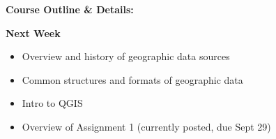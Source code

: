 \documentclass[aspectratio=169]{beamer}
\begin{document}
%		
%	
%	
%	
%	


%
%
%



\begin{frame}
	\LARGE{\textbf{Course Outline \& Details:}}
\end{frame}









\begin{frame}
	\textbf{Next Week}
	
	\begin{itemize}
		\item Overview and history of geographic data sources
		\item Common structures and formats of geographic data
		\item Intro to QGIS 
		\item Overview of Assignment 1 (currently posted, due Sept 29)
	\end{itemize}

\end{frame}
\end{document}
